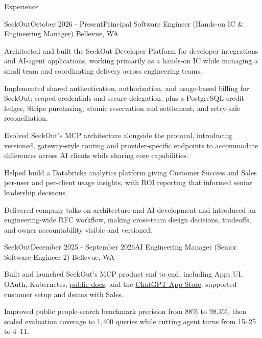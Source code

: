 \documentclass{resume} %
\begin{document}

\begin{rSection}{Experience}
    \begin{rSubsection}{SeekOut}{October 2026 - Present}{Principal Software Engineer (Hands-on IC \& Engineering Manager) \textbar{} Bellevue, WA}
        \item Architected and built the SeekOut Developer Platform for developer integrations and AI-agent applications, working primarily as a hands-on IC while managing a small team and coordinating delivery across engineering teams.
        \item Implemented shared authentication, authorization, and usage-based billing for SeekOut: scoped credentials and secure delegation, plus a PostgreSQL credit ledger, Stripe purchasing, atomic reservation and settlement, and retry-safe reconciliation.
        \item Evolved SeekOut's MCP architecture alongside the protocol, introducing versioned, gateway-style routing and provider-specific endpoints to accommodate differences across AI clients while sharing core capabilities.
        \item Helped build a Databricks analytics platform giving Customer Success and Sales per-user and per-client usage insights, with ROI reporting that informed senior leadership decisions.
        \item Delivered company talks on architecture and AI development and introduced an engineering-wide RFC workflow, making cross-team design decisions, tradeoffs, and owner accountability visible and versioned.
    \end{rSubsection}
    \begin{rSubsection}{SeekOut}{December 2025 - September 2026}{AI Engineering Manager (Senior Software Engineer 2) \textbar{} Bellevue, WA}
        \item Built and launched SeekOut's MCP product end to end, including Apps UI, OAuth, Kubernetes, \href{https://seekout-search-mcp.seekout.io/}{public docs}, and the \href{https://chatgpt.com/apps/seekout/asdk_app_69f8dfd382048191829f4025e39c853e}{ChatGPT App Store}; supported customer setup and demos with Sales.
        \item Improved public people-search benchmark precision from 88\% to 98.3\%, then scaled evaluation coverage to 1,400 queries while cutting agent turns from 15--25 to 4--11.

\end{rSubsection}
\end{rSection}
\end{document}
